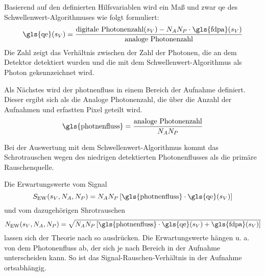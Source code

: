 \noindent
Basierend auf den definierten Hilfsvariablen wird ein Maß und zwar \gls{qe} des Schwellenwert-Algorithmuses wie folgt formuliert:
\begin{equation}
    \text{\gls{qe}}(s_V) = \frac{\text{digitale Photonenzahl}(s_V) - N_A N_P \cdot \text{\gls{fdpa}}(s_V)}{\text{analoge Photonenzahl}}
\end{equation}
Die Zahl zeigt das Verhältnis zwischen der Zahl der Photonen, die an dem Detektor detektiert wurden und die mit dem Schwellenwert-Algorithmus als Photon gekennzeichnet wird.

\noindent
Als Nächstes wird der \gls{photnenfluss} in einem Bereich der Aufnahme definiert. Dieser ergibt sich als die Analoge Photonenzahl, die über die Anzahl der Aufnahmen und erfastten Pixel geteilt wird.
\begin{equation}
    \text{\gls{photnenfluss}} = \frac{\text{analoge Photonenzahl}}{N_A N_P}
\end{equation}

\noindent
Bei der Auswertung mit dem Schwellenwert-Algorithmus kommt das Schrotrauschen wegen des niedrigen detektierten Photonenflusses als die primäre Rauschenquelle.

\noindent
Die Erwartungswerte vom Signal 
\begin{equation}
        S_{\text{EW}}(s_V, N_A, N_P) = N_{A}N_{P}\left[\text{\gls{photnenfluss}}\cdot\text{\gls{qe}}(s_V)\right]
        \label{eq:signal_ew}
\end{equation}
und vom dazugehörigen Shrotrauschen 
\begin{equation}
        N_{\text{EW}}(s_V, N_A, N_P) = \sqrt{N_{A}N_{P}\left[\text{\gls{photnenfluss}}\cdot\text{\gls{qe}}(s_V) + \text{\gls{fdpa}}(s_V)\right]}
        \label{eq:noise_ew}
\end{equation}
lassen sich der Theorie nach so ausdrücken. Die Erwartungswerte hängen u. a. von dem Photonenfluss ab, der sich je nach Bereich in der Aufnahme unterscheiden kann. So ist das Signal-Rauschen-Verhältnis in der Aufnahme ortsabhängig.  

